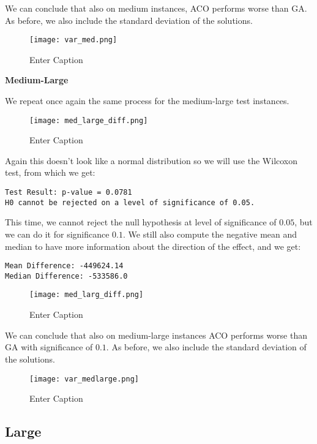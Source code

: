 \documentclass{article}
\begin{document}
We can conclude that also on medium instances, ACO performs worse than GA.
As before, we also include the standard deviation of the solutions.

\begin{figure}[H]
    \centering
    \texttt{[image: var\_med.png]}
    \caption{Enter Caption}
    \label{fig:enter-label}
\end{figure}

\textbf{Medium-Large}

We repeat once again the same process for the medium-large test instances.
\begin{figure}[H]
    \centering
    \texttt{[image: med\_large\_diff.png]}
    \caption{Enter Caption}
    \label{fig:enter-label}
\end{figure}

Again this doesn't look like a normal distribution so we will use the Wilcoxon test, from which we get:
\begin{verbatim}
Test Result: p-value = 0.0781 
H0 cannot be rejected on a level of significance of 0.05. 
\end{verbatim}
This time, we cannot reject the null hypothesis at level of significance of $0.05$, but we can do it for significance $0.1$. We still also compute the negative mean and median to have more information about the direction of the effect, and we get:
\begin{verbatim}
Mean Difference: -449624.14 
Median Difference: -533586.0 
\end{verbatim}
\begin{figure}[H]
    \centering
    \texttt{[image: med\_larg\_diff.png]}
    \caption{Enter Caption}
    \label{fig:enter-label}
\end{figure}

We can conclude that also on medium-large instances ACO performs worse than GA with significance of $0.1$.
As before, we also include the standard deviation of the solutions.

\begin{figure}[H]
    \centering
    \texttt{[image: var\_medlarge.png]}
    \caption{Enter Caption}
    \label{fig:enter-label}
\end{figure}

\subsection{Large}
\end{document}
